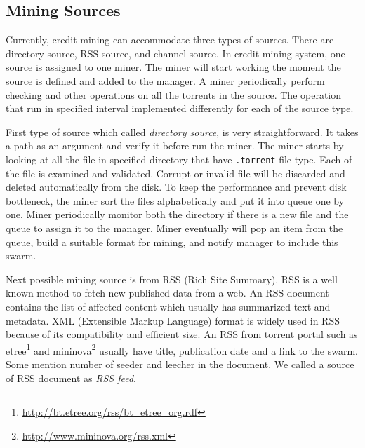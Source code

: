 
\subsection{Mining Sources}
\label{section:msource} 
Currently, credit mining can accommodate three types of sources. There are directory source, RSS source, and channel source. In credit mining system, one source is assigned to one miner. The miner will start working the moment the source is defined and added to the manager. A miner periodically perform checking and other operations on all the torrents in the source. The operation that run in specified interval implemented differently for each of the source type. 

First type of source which called \textit{directory source}, is very straightforward. It takes a path as an argument and verify it before run the miner. The miner starts by looking at all the file in specified directory that have \texttt{.torrent} file type. Each of the file is examined and validated. Corrupt or invalid file will be discarded and deleted automatically from the disk. To keep the performance and prevent disk bottleneck, the miner sort the files alphabetically and put it into queue one by one. Miner periodically monitor both the directory if there is a new file and the queue to assign it to the manager. Miner eventually will pop an item from the queue, build a suitable format for mining, and notify manager to include this swarm.

Next possible mining source is from RSS (Rich Site Summary). RSS is a well known method to fetch new published data from a web. An RSS document contains the list of affected content which usually has summarized text and metadata. XML (Extensible Markup Language) format is widely used in RSS because of its compatibility and efficient size. An RSS from torrent portal such as etree\footnote{\url{http://bt.etree.org/rss/bt_etree_org.rdf}} and mininova\footnote{\url{http://www.mininova.org/rss.xml}} usually have title, publication date and a link to the swarm. Some mention number of seeder and leecher in the document. We called a source of RSS document as \textit{RSS feed}. 

